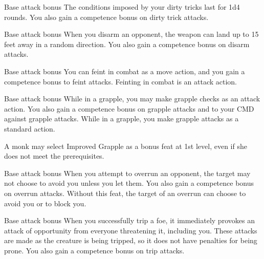  Base attack bonus 
 The conditions imposed by your dirty tricks last for 1d4 rounds. You also gain a  competence bonus on dirty trick attacks.

 Base attack bonus 
 When you disarm an opponent, the weapon can land up to 15 feet away in a random direction. You also gain a  competence bonus on disarm attacks.

 Base attack bonus 
 You can feint in combat as a move action, and you gain a  competence bonus to feint attacks.
 Feinting in combat is an attack action.

 Base attack bonus 
 While in a grapple, you may make grapple checks as an attack action. You also gain a  competence bonus on grapple attacks and to your CMD against grapple attacks.
 While in a grapple, you make grapple attacks as a standard action.
\par A monk may select Improved Grapple as a bonus feat at 1st level, even if she does not meet the prerequisites.

 Base attack bonus 
 When you attempt to overrun an opponent, the target may not choose to avoid you unless you let them. You also gain a  competence bonus on overrun attacks.
 Without this feat, the target of an overrun can choose to avoid you or to block you.

\begin{comment}
\feat{Improved Sunder}{Combat, Maneuver}
\parhead{Prerequisites} Base attack bonus \plus4
\parhead{Benefit} When you strike at an object held or carried by an opponent (such as a weapon or shield), you ignore half the hardness of the sundered item. You also gain a \plus2 competence bonus on sunder attacks.
\end{comment}

 Base attack bonus 
 When you successfully trip a foe, it immediately provokes an attack of opportunity from everyone threatening it, including you. These attacks are made as the creature is being tripped, so it does not have penalties for being prone. You also gain a  competence bonus on trip attacks.

